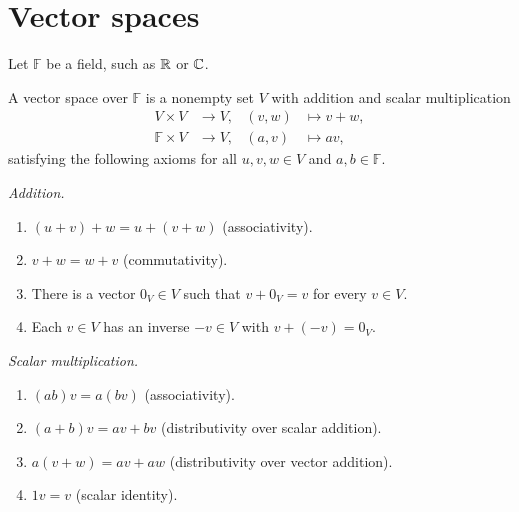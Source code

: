 \section{Vector spaces}
\label{sec:linear-algebra-i:vector-spaces}

Let \(\mathbb F\) be a field, such as \(\mathbb{R}\) or \(\mathbb{C}\).

\begin{definition}
  A vector space over \(\mathbb F\) is a nonempty set \(V\) with
  addition and scalar multiplication
  \[
    \begin{aligned}
      V\times V&\longrightarrow V,& (v,w)&\longmapsto v+w,\\
      \mathbb F\times V&\longrightarrow V,& (a,v)&\longmapsto av,
    \end{aligned}
  \]
  satisfying the following axioms for all \(u,v,w\in V\) and
  \(a,b\in\mathbb F\).

  \emph{Addition.}
  \begin{enumerate}[({A}1)][4]
    \setlength{\itemsep}{3pt}
    \setlength{\parsep}{0pt}
    \item \((u+v)+w=u+(v+w)\) (associativity).
    \item \(v+w=w+v\) (commutativity).
    \item There is a vector \(0_V\in V\) such that \(v+0_V=v\)
      for every \(v\in V\).
    \item Each \(v\in V\) has an inverse \(-v\in V\) with
      \(v+(-v)=0_V\).
  \end{enumerate}

  \emph{Scalar multiplication.}
  \begin{enumerate}[({S}1)][4]
    \setlength{\itemsep}{3pt}
    \setlength{\parsep}{0pt}
    \item \((ab)v=a(bv)\) (associativity).
    \item \((a+b)v=av+bv\) (distributivity over scalar addition).
    \item \(a(v+w)=av+aw\) (distributivity over vector addition).
    \item \(1v=v\) (scalar identity).
  \end{enumerate}
\end{definition}

